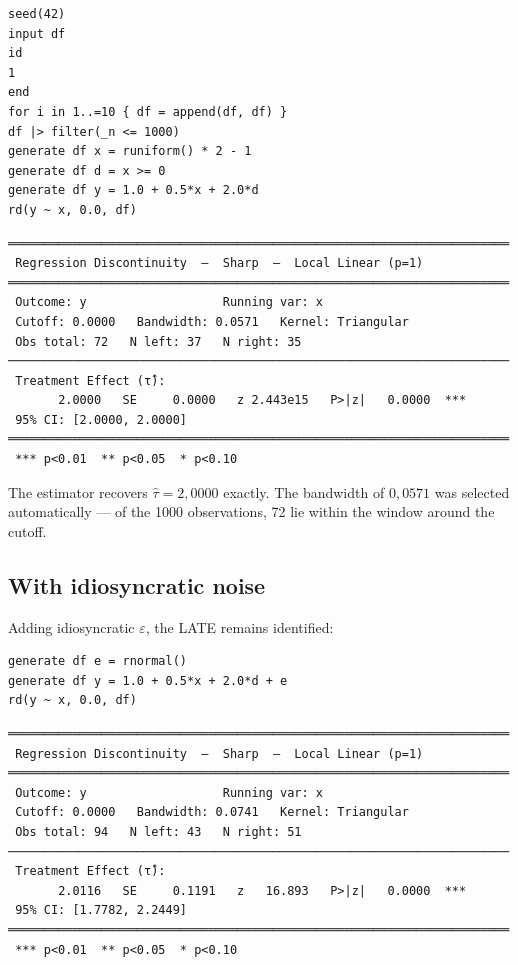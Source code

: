 \begin{lstlisting}[caption={Noise-free RDD DGP --- exact recovery}]
seed(42)
input df
id
1
end
for i in 1..=10 { df = append(df, df) }
df |> filter(_n <= 1000)
generate df x = runiform() * 2 - 1
generate df d = x >= 0
generate df y = 1.0 + 0.5*x + 2.0*d
rd(y ~ x, 0.0, df)
\end{lstlisting}

\begin{lstlisting}[language={}, basicstyle=\ttfamily\small,
  frame=none, numbers=none, backgroundcolor=\color{codbg},
  xleftmargin=0pt, xrightmargin=0pt, breaklines=false]
══════════════════════════════════════════════════════════════════════
 Regression Discontinuity  —  Sharp  —  Local Linear (p=1)
══════════════════════════════════════════════════════════════════════
 Outcome: y                   Running var: x
 Cutoff: 0.0000   Bandwidth: 0.0571   Kernel: Triangular
 Obs total: 72   N left: 37   N right: 35
──────────────────────────────────────────────────────────────────────
 Treatment Effect (τ̂):
       2.0000   SE     0.0000   z 2.443e15   P>|z|   0.0000  ***
 95% CI: [2.0000, 2.0000]
══════════════════════════════════════════════════════════════════════
 *** p<0.01  ** p<0.05  * p<0.10
\end{lstlisting}

The estimator recovers $\hat\tau = 2{,}0000$ exactly. The bandwidth of
$0{,}0571$ was selected automatically --- of the 1000 observations, 72 lie
within the window around the cutoff.

\subsection*{With idiosyncratic noise}

Adding idiosyncratic $\varepsilon$, the LATE remains identified:

\begin{lstlisting}[caption={RDD DGP with noise}]
generate df e = rnormal()
generate df y = 1.0 + 0.5*x + 2.0*d + e
rd(y ~ x, 0.0, df)
\end{lstlisting}

\begin{lstlisting}[language={}, basicstyle=\ttfamily\small,
  frame=none, numbers=none, backgroundcolor=\color{codbg},
  xleftmargin=0pt, xrightmargin=0pt, breaklines=false]
══════════════════════════════════════════════════════════════════════
 Regression Discontinuity  —  Sharp  —  Local Linear (p=1)
══════════════════════════════════════════════════════════════════════
 Outcome: y                   Running var: x
 Cutoff: 0.0000   Bandwidth: 0.0741   Kernel: Triangular
 Obs total: 94   N left: 43   N right: 51
──────────────────────────────────────────────────────────────────────
 Treatment Effect (τ̂):
       2.0116   SE     0.1191   z   16.893   P>|z|   0.0000  ***
 95% CI: [1.7782, 2.2449]
══════════════════════════════════════════════════════════════════════
 *** p<0.01  ** p<0.05  * p<0.10
\end{lstlisting}

